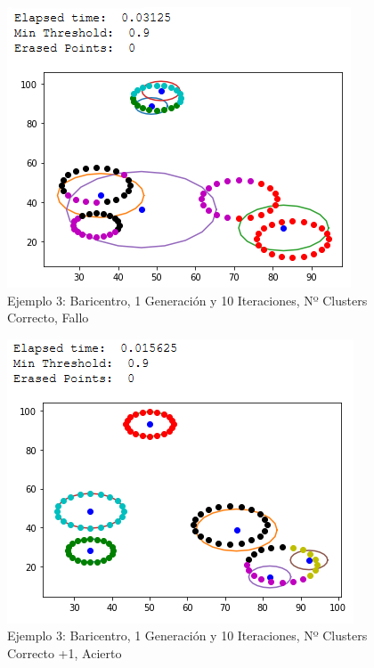 \documentclass[conference,a4paper]{IEEEtran}
\begin{document}
\begin{figure}[H]
\centering
\includegraphics[scale=0.65]{Experimentacion/Ejemplo3/ej3_b_1_10_cc_wrong}
\caption{Ejemplo 3: Baricentro, 1 Generación y 10 Iteraciones,  Nº Clusters Correcto, Fallo\\}
\end{figure}

\begin{figure}[H]
\centering
\includegraphics[scale=0.65]{Experimentacion/Ejemplo3/ej3_b_1_10_mc_correct}
\caption{Ejemplo 3: Baricentro, 1 Generación y 10 Iteraciones,  Nº Clusters Correcto +1, Acierto\\}
\end{figure}
\end{document}
